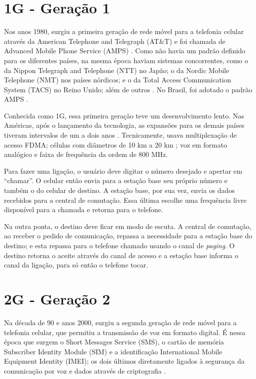 \documentclass[11pt,oneside,a4paper]{abntex2}
\begin{document}
\section*{1G - Geração 1}
\label{1g}

Nos anos 1980, surgiu a primeira geração de rede móvel para a telefonia celular através da American Telephone and Telegraph (AT\&T) e foi chamada de Advanced Mobile Phone Service (AMPS) \cite{tcc1}. Como não havia um padrão definido para os diferentes países, na mesma época haviam sistemas concorrentes, como o da Nippon Telegraph and Telephone (NTT) no Japão; o da Nordic Mobile Telephone (NMT) nos países nórdicos; e o da Total Access Communication System (TACS) no Reino Unido; além de outros \cite{wiki-1g-br, wiki-1g-en}. No Brasil, foi adotado o padrão AMPS \cite{tcc2}.

Conhecida como 1G, essa primeira geração teve um desenvolvimento lento. Nas Américas, após o lançamento da tecnologia, as expansões para os demais países tiveram intervalos de um a dois anos \cite{repor1}. Tecnicamente, usava multiplexação de acesso FDMA; células com diâmetros de 10 km a 20 km \cite{aula3}; voz em formato analógico e faixa de frequência da ordem de 800 MHz.

Para fazer uma ligação, o usuário deve digitar o número desejado e apertar em ``chamar''. O celular então envia para a estação base seu próprio número e também o do celular de destino. A estação base, por sua vez, envia os dados recebidos para a central de comutação. Essa última escolhe uma frequência livre disponível para a chamada e retorna para o telefone.

Na outra ponta, o destino deve ficar em modo de escuta. A central de comutação, ao receber o pedido de comunicação, repassa a necessidade para a estação base do destino; e esta repassa para o telefone chamado  usando o canal de \textit{paging}. O destino retorna o aceite através do canal de acesso e a estação base informa o canal da ligação, para só então o telefone tocar.

\section*{2G - Geração 2}
\label{2g}

Na década de 90 e anos 2000, surgiu a segunda geração de rede móvel para a telefonia celular, que permitiu a transmissão de voz em formato digital. É nessa época que surgem o Short Messages Service (SMS), o cartão de memória Subscriber Identity Module (SIM) e a identificação International Mobile Equipment Identity (IMEI); os dois últimos diretamente ligados à segurança da comunicação por voz e dados através de criptografia \cite{tcc2}.
\end{document}

